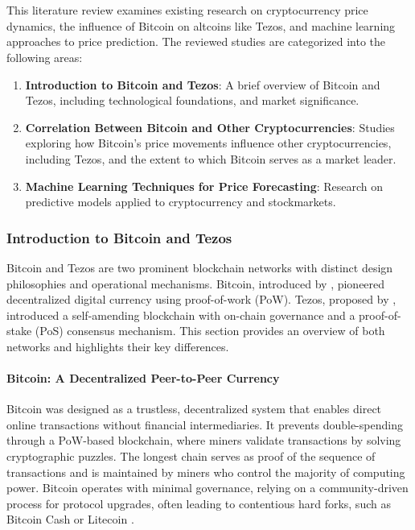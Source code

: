 \chapter{}%
\label{ch:stand-van-zaken}

This literature review examines existing research on cryptocurrency price dynamics, the influence of Bitcoin on altcoins like Tezos, and machine learning approaches to price prediction. The reviewed studies are categorized into the following areas:

\begin{enumerate}
    \item \textbf{Introduction to Bitcoin and Tezos}:
    A brief overview of Bitcoin and Tezos, including technological foundations, and market significance.
    \item \textbf{Correlation Between Bitcoin and Other Cryptocurrencies}:  
    Studies exploring how Bitcoin's price movements influence other cryptocurrencies, including Tezos, and the extent to which Bitcoin serves as a market leader.
    
    \item \textbf{Machine Learning Techniques for Price Forecasting}:  
    Research on predictive models applied to cryptocurrency and stockmarkets.
\end{enumerate}

\subsection{Introduction to Bitcoin and Tezos}
Bitcoin and Tezos are two prominent blockchain networks with distinct design philosophies and operational mechanisms. Bitcoin, introduced by \autocite{bitcoinwhitepaper2008}, pioneered decentralized digital currency using proof-of-work (PoW). Tezos, proposed by \autocite{tezos2014goodman}, introduced a self-amending blockchain with on-chain governance and a proof-of-stake (PoS) consensus mechanism. This section provides an overview of both networks and highlights their key differences.

\subsubsection{Bitcoin: A Decentralized Peer-to-Peer Currency}

Bitcoin was designed as a trustless, decentralized system that enables direct online transactions without financial intermediaries. It prevents double-spending through a PoW-based blockchain, where miners validate transactions by solving cryptographic puzzles. The longest chain serves as proof of the sequence of transactions and is maintained by miners who control the majority of computing power. Bitcoin operates with minimal governance, relying on a community-driven process for protocol upgrades, often leading to contentious hard forks, such as Bitcoin Cash or Litecoin \textcite{coinmarketcap}.

